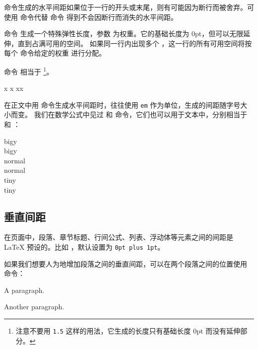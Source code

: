  命令生成的水平间距如果位于一行的开头或末尾，则有可能因为断行而被舍弃。可使用  命令代替  命令
得到不会因断行而消失的水平间距。

命令  生成一个特殊弹性长度，参数  为权重。它的基础长度为 0pt，但可以无限延伸，直到占满可用的空间。
如果同一行内出现多个 ，这一行的所有可用空间将按每个  命令给定的权重  进行分配。

命令  相当于 %
\footnote{注意不要用 \texttt{1.5} 这样的用法，它生成的长度只有基础长度 0pt 而没有延伸部分。}。

\begin{example}
x
x
x\hspace{\fill}x
\end{example}

在正文中用  命令生成水平间距时，往往使用 \texttt{em} 作为单位，生成的间距随字号大小而变。
我们在数学公式中见过  和  命令，它们也可以用于文本中，分别相当于 \marg*{1em} 和 \marg*{2em}：

\begin{example}
{\Large big\hspace{1em}y}\\
{\Large big\quad y}\\
nor\hspace{2em}mal\\
nor\qquad mal\\
{\tiny tin\hspace{1em}y}\\
{\tiny tin\quad y}
\end{example}

\subsection{垂直间距}\label{subsec:vspace}

在页面中，段落、章节标题、行间公式、列表、浮动体等元素之间的间距是 \LaTeX{} 预设的。比如 ，默认设置为 \texttt{0pt plus 1pt}。

如果我们想要人为地增加段落之间的垂直间距，可以在两个段落之间的位置使用  命令：
\begin{example}
A paragraph.

\vspace{2ex}
Another paragraph.
\end{example}

